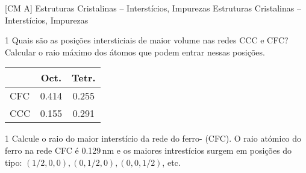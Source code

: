 \documentclass[\mainfilename]{subfiles}
\begin{document}

[CM A]
{Estruturas Cristalinas -- Interstícios, Impurezas} %
{Estruturas Cristalinas -- Interstícios, Impurezas} %

\setcounter{question}{11}

\begin{questionBox}1{ %
    Quais são as posições intersticiais de maior volume nas redes CCC e CFC? Calcular o raio máximo dos átomos que podem entrar nessas posições.
} %
    \answer{}
    \begin{center}
        \vspace{1ex}
        \begin{tabular}{l c c}
            \toprule
            
                & Oct. & Tetr.
            
            \\\midrule
            
                CFC & 0.414 & 0.255
                \\
                CCC & 0.155 & 0.291
            
            \\\bottomrule
        \end{tabular}
        \vspace{2ex}
    \end{center}
\end{questionBox}

\begin{questionBox}1{ %
    Calcule o raio do maior interstício da rede do ferro-\chemgamma{} (CFC). O raio atómico do ferro na rede CFC é 0.129\,\unit{\nano\metre} e os maiores intrestícios surgem em posições do tipo:
    \((1/2,0,0),(0,1/2,0),(0,0,1/2)\), etc.
} %
\end{questionBox}
\end{document}
